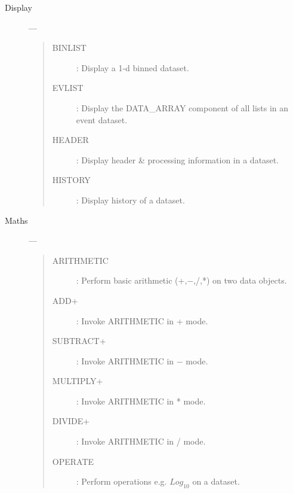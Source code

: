 \begin{description}
\item [Display] ---
\begin{quote}
\begin{description}
\item [BINLIST] :  Display a 1-d binned dataset.
\item [EVLIST] :   Display the DATA\_ARRAY component of all lists in an event dataset.
\item [HEADER] :   Display header \& processing information in a dataset.
\item [HISTORY] :  Display history of a dataset.
\end{description}
\end{quote}

\item [Maths] ---
\begin{quote}
\begin{description}
\item [ARITHMETIC] : Perform basic arithmetic (+,$-$,/,*) on two data objects.
\item [ADD+]       : Invoke ARITHMETIC in + mode.
\item [SUBTRACT+]  : Invoke ARITHMETIC in $-$ mode.
\item [MULTIPLY+]  : Invoke ARITHMETIC in * mode.
\item [DIVIDE+]    : Invoke ARITHMETIC in / mode.
\item [OPERATE]    : Perform operations e.g. $Log_{10}$ on a dataset.
\end{description}
\end{quote}


\end{description}
